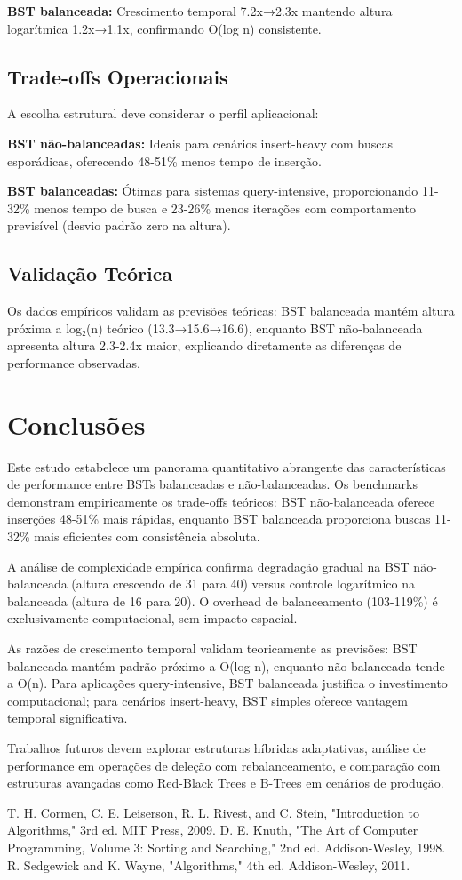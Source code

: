 \documentclass[conference]{IEEEtran}
\begin{document}
\textbf{BST balanceada:} Crescimento temporal 7.2x→2.3x mantendo altura logarítmica 1.2x→1.1x, confirmando O(log n) consistente.

\subsection{Trade-offs Operacionais}
A escolha estrutural deve considerar o perfil aplicacional:

\textbf{BST não-balanceadas:} Ideais para cenários insert-heavy com buscas esporádicas, oferecendo 48-51\% menos tempo de inserção.

\textbf{BST balanceadas:} Ótimas para sistemas query-intensive, proporcionando 11-32\% menos tempo de busca e 23-26\% menos iterações com comportamento previsível (desvio padrão zero na altura).

\subsection{Validação Teórica}
Os dados empíricos validam as previsões teóricas: BST balanceada mantém altura próxima a log₂(n) teórico (13.3→15.6→16.6), enquanto BST não-balanceada apresenta altura 2.3-2.4x maior, explicando diretamente as diferenças de performance observadas.

\section{Conclusões}
Este estudo estabelece um panorama quantitativo abrangente das características de performance entre BSTs balanceadas e não-balanceadas. Os benchmarks demonstram empiricamente os trade-offs teóricos: BST não-balanceada oferece inserções 48-51\% mais rápidas, enquanto BST balanceada proporciona buscas 11-32\% mais eficientes com consistência absoluta.

A análise de complexidade empírica confirma degradação gradual na BST não-balanceada (altura crescendo de 31 para 40) versus controle logarítmico na balanceada (altura de 16 para 20). O overhead de balanceamento (103-119\%) é exclusivamente computacional, sem impacto espacial.

As razões de crescimento temporal validam teoricamente as previsões: BST balanceada mantém padrão próximo a O(log n), enquanto não-balanceada tende a O(n). Para aplicações query-intensive, BST balanceada justifica o investimento computacional; para cenários insert-heavy, BST simples oferece vantagem temporal significativa.

Trabalhos futuros devem explorar estruturas híbridas adaptativas, análise de performance em operações de deleção com rebalanceamento, e comparação com estruturas avançadas como Red-Black Trees e B-Trees em cenários de produção.

\begin{thebibliography}{00}
 T. H. Cormen, C. E. Leiserson, R. L. Rivest, and C. Stein, "Introduction to Algorithms," 3rd ed. MIT Press, 2009.
 D. E. Knuth, "The Art of Computer Programming, Volume 3: Sorting and Searching," 2nd ed. Addison-Wesley, 1998.
 R. Sedgewick and K. Wayne, "Algorithms," 4th ed. Addison-Wesley, 2011.
\end{thebibliography}
\end{document}
